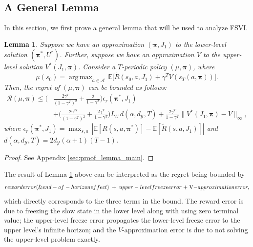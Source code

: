 \documentclass[11pt, notitlepage]{article}
\DeclareMathOperator*{\argmax}{arg\,max}
\newcommand{\E}{\mathbb{E}}
\newcommand{\1}{\mathbbm{1}}
\newtheorem{lemma}{Lemma}[section]
\begin{document}
\subsection{A General Lemma}
\label{sec:general_lemma}
In this section, we first prove a general lemma that will be used to analyze FSVI.

\begin{lemma}
\label{lemma:main}
Suppose we have an approximation $(\boldsymbol{\pi}, J_1)$ to the lower-level solution $(\boldsymbol{\pi}^*, U^*)$. Further, suppose we have an approximation $V$ to the upper-level solution $V^*(J_1, \boldsymbol{\pi})$. Consider a $T$-periodic policy $(\mu, \boldsymbol{\pi})$, where
\begin{equation}
\label{eq.mu_approx_opt}
\mu(s_0) = \argmax_{a\in\mathcal A} \, \E\bigl[\tilde{R}(s_0, a, J_1) + \gamma^T V(s_T(a, \boldsymbol{\pi}))\bigr].
\end{equation}
Then, the regret of $(\mu, \boldsymbol{\pi})$ can be bounded as follows:
\begin{align*}
\mathcal R(\mu, \boldsymbol{\pi}) \leq \biggl(&\frac{2\gamma^T}{(1-\gamma^T)^2} + \frac{2}{1-\gamma^T}\biggr) \epsilon_r(\boldsymbol{\pi}^*, J_1) \\
&+ \biggl(\frac{2\gamma^{2T}}{(1-\gamma^T)^2} + \frac{2\gamma^T}{1-\gamma^T}\biggr) L_U \, d(\alpha,d_\mathcal{Y},T) + \frac{2\gamma^T}{1-\gamma^T} \bigl \| V^*(J_1, \boldsymbol{\pi}) - V \bigr\|_\infty,
\end{align*}
where $\epsilon_r(\boldsymbol{\pi}^*, J_1) = \max_{s,a} \, |\E [R(s, a, \boldsymbol{\pi}^*)] - \E [\tilde{R}(s, a, J_1)]|$ and $d(\alpha,d_\mathcal{Y},T) = 2 d_\mathcal{Y} (\alpha+1) (T-1)$.
\end{lemma}
\begin{proof}
See Appendix \ref{sec:proof_lemma_main}.
\end{proof}

The result of Lemma \ref{lemma:main} above can be interpreted as the regret being bounded by
\[
\textnormal{reward error (\& end-of-horizon effect)} \; +\; \textnormal{upper-level freeze error} \; +\; \textnormal{$V$-approximation error},
\]
which directly corresponds to the three terms in the bound. The reward error is due to freezing the slow state in the lower level along with using zero terminal value; the upper-level freeze error propagates the lower-level freeze error to the upper level's infinite horizon; and the $V$-approximation error is due to not solving the upper-level problem exactly.
\end{document}
